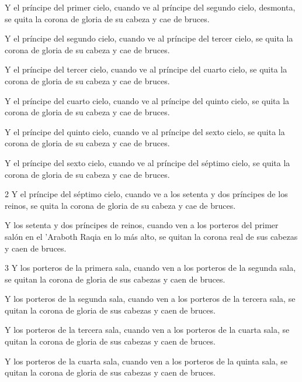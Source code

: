 \par Y el príncipe del primer cielo, cuando ve al príncipe del segundo cielo, desmonta, se quita la corona de gloria de su cabeza y cae de bruces.

\par Y el príncipe del segundo cielo, cuando ve al príncipe del tercer cielo, se quita la corona de gloria de su cabeza y cae de bruces.

\par Y el príncipe del tercer cielo, cuando ve al príncipe del cuarto cielo, se quita la corona de gloria de su cabeza y cae de bruces.

\par Y el príncipe del cuarto cielo, cuando ve al príncipe del quinto cielo, se quita la corona de gloria de su cabeza y cae de bruces.

\par Y el príncipe del quinto cielo, cuando ve al príncipe del sexto cielo, se quita la corona de gloria de su cabeza y cae de bruces.

\par Y el príncipe del sexto cielo, cuando ve al príncipe del séptimo cielo, se quita la corona de gloria de su cabeza y cae de bruces.

\par 2 Y el príncipe del séptimo cielo, cuando ve a los setenta y dos príncipes de los reinos, se quita la corona de gloria de su cabeza y cae de bruces.

\par Y los setenta y dos príncipes de reinos, cuando ven a los porteros del primer salón en el 'Araboth Raqia en lo más alto, se quitan la corona real de sus cabezas y caen de bruces.

\par 3 Y los porteros de la primera sala, cuando ven a los porteros de la segunda sala, se quitan la corona de gloria de sus cabezas y caen de bruces.

\par Y los porteros de la segunda sala, cuando ven a los porteros de la tercera sala, se quitan la corona de gloria de sus cabezas y caen de bruces.

\par Y los porteros de la tercera sala, cuando ven a los porteros de la cuarta sala, se quitan la corona de gloria de sus cabezas y caen de bruces.

\par Y los porteros de la cuarta sala, cuando ven a los porteros de la quinta sala, se quitan la corona de gloria de sus cabezas y caen de bruces.

